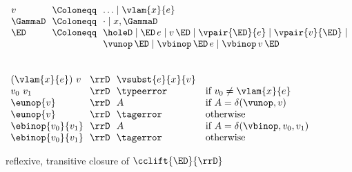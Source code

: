 \begin{flushleft}

\\
$\begin{array}{l@{~~}c@{~~}l}
  v & \Coloneqq & \ldots \mid \vlam{x}{e}
\\
  \GammaD & \Coloneqq & \cdot \mid x,\GammaD
\\
  \ED & \Coloneqq & \holeD \mid \ED\,e \mid v\,\ED \mid \vpair{\ED}{e} \mid \vpair{v}{\ED} \mid
\\ & & \vunop\,\ED \mid \vbinop\,\ED\,e \mid \vbinop\,v\,\ED
\end{array}$

\medskip
{}
\begin{mathpar}






\end{mathpar}

\medskip
{}\\
$\begin{array}{l@{~~}c@{~~}l l}
  (\vlam{x}{e})~v & \rrD & \vsubst{e}{x}{v} &
\\
  v_0~v_1 & \rrD & \typeerror & \mbox{if $v_0 \neq \vlam{x}{e}$}
\\
  \eunop{v} & \rrD & A & \mbox{if $A = \delta(\vunop, v)$}
\\
  \eunop{v} & \rrD & \tagerror & \mbox{otherwise}
\\
  \ebinop{v_0}{v_1} & \rrD & A & \mbox{if $A = \delta(\vbinop, v_0, v_1)$}
\\
  \ebinop{v_0}{v_1} & \rrD & \tagerror & \mbox{otherwise}
\end{array}$

\medskip
{} reflexive, transitive closure of $\cclift{\ED}{\rrD}$

\end{flushleft}
